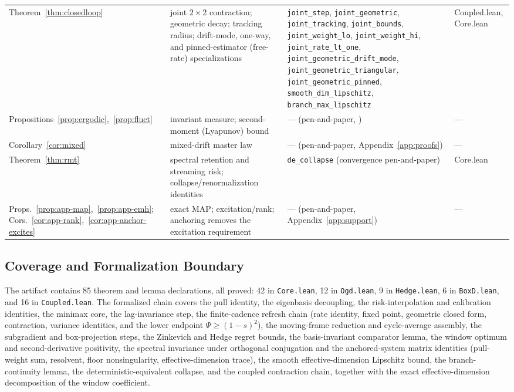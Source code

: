 {\begin{longtable}{@{}p{1.02in} p{1.12in} p{1.9in} l@{}}
Theorem~\ref{thm:closedloop} & joint $2\times2$ contraction; geometric decay; tracking radius; drift-mode, one-way, and pinned-estimator (free-rate) specializations & \texttt{joint\_step}, \texttt{joint\_geometric}, \texttt{joint\_tracking}, \texttt{joint\_bounds}, \texttt{joint\_weight\_lo}, \texttt{joint\_weight\_hi}, \texttt{joint\_rate\_lt\_one}, \texttt{joint\_geometric\_drift\_mode}, \texttt{joint\_geometric\_triangular}, \texttt{joint\_geometric\_pinned}, \texttt{smooth\_dim\_lipschitz}, \texttt{branch\_max\_lipschitz} & Coupled.lean, Core.lean \\
Propositions~\ref{prop:ergodic},~\ref{prop:fluct} & invariant measure; second-moment (Lyapunov) bound & --- (pen-and-paper, \citealp{meyn2009}) & --- \\
\midrule
Corollary~\ref{cor:mixed} & mixed-drift master law & --- (pen-and-paper, Appendix~\ref{app:proofs}) & --- \\
Theorem~\ref{thm:rmt} & spectral retention and streaming risk; collapse/renormalization identities & \texttt{de\_collapse} (convergence pen-and-paper) & Core.lean \\
Props.~\ref{prop:app-map},~\ref{prop:app-emh}; Cors.~\ref{cor:app-rank},~\ref{cor:app-anchor-excites} & exact MAP; excitation/rank; anchoring removes the excitation requirement & --- (pen-and-paper, Appendix~\ref{app:support}) & --- \\
\end{longtable}}

\subsection{Coverage and Formalization Boundary}
The artifact contains 85 theorem and lemma declarations, all proved: 42 in \texttt{Core.lean}, 12 in \texttt{Ogd.lean}, 9 in \texttt{Hedge.lean}, 6 in \texttt{BoxD.lean}, and 16 in \texttt{Coupled.lean}.
The formalized chain covers the pull identity, the eigenbasis decoupling, the risk-interpolation and calibration identities, the minimax core, the lag-invariance step, the finite-cadence refresh chain (rate identity, fixed point, geometric closed form, contraction, variance identities, and the lower endpoint $\Psi \ge (1-s)^2$), the moving-frame reduction and cycle-average assembly, the subgradient and box-projection steps, the Zinkevich and Hedge regret bounds, the basis-invariant comparator lemma, the window optimum and second-derivative positivity, the spectral invariance under orthogonal conjugation and the anchored-system matrix identities (pull-weight sum, resolvent, floor nonsingularity, effective-dimension trace), the smooth effective-dimension Lipschitz bound, the branch-continuity lemma, the deterministic-equivalent collapse, and the coupled contraction chain, together with the exact effective-dimension decomposition of the window coefficient.

